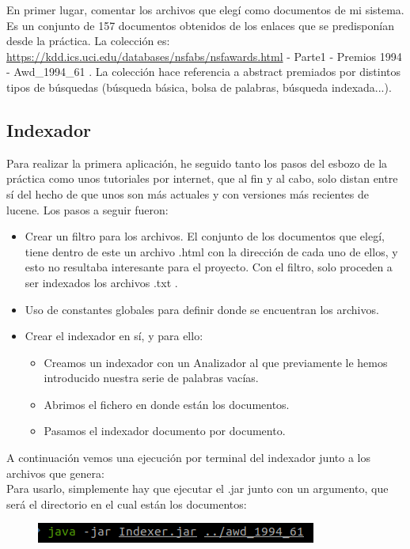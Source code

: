 En primer lugar, comentar los archivos que elegí como documentos de mi sistema. Es un conjunto de 157 documentos obtenidos de los enlaces que se predisponían desde la práctica. La colección es: \url{https://kdd.ics.uci.edu/databases/nsfabs/nsfawards.html} - Parte1 - Premios 1994 - Awd\_1994\_61 . La colección hace referencia a abstract premiados por distintos tipos de búsquedas (búsqueda básica, bolsa de palabras, búsqueda indexada...).\\ 

\subsection{Indexador}
Para realizar la primera aplicación, he seguido tanto los pasos del esbozo de la práctica como unos tutoriales por internet, que al fin y al cabo, solo distan entre sí del hecho de que unos son más actuales y con versiones más recientes de lucene. Los pasos a seguir fueron:

\begin{itemize}
	\item Crear un filtro para los archivos.
	El conjunto de los documentos que elegí, tiene dentro de este un archivo .html con la dirección de cada uno de ellos, y esto no resultaba interesante para el proyecto. Con el filtro, solo proceden a ser indexados los archivos .txt .
	\item Uso de constantes globales para definir donde se encuentran los archivos.
	\item Crear el indexador en sí, y para ello:
	\begin{itemize}
		\item Creamos un indexador con un Analizador al que previamente le hemos introducido nuestra serie de palabras vacías.
		\item Abrimos el fichero en donde están los documentos.
		\item Pasamos el indexador documento por documento.
	\end{itemize}
\end{itemize}

A continuación vemos una ejecución por terminal del indexador junto a los archivos que genera:\\

Para usarlo, simplemente hay que ejecutar el .jar junto con un argumento, que será el directorio en el cual están los documentos:

\begin{figure}[H]
	\centering
	\includegraphics[width=0.4\linewidth]{Imagenes/screenshot001}
	\label{fig:screenshot001}
\end{figure}

